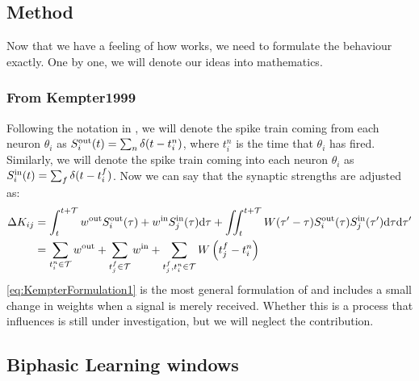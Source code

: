 \subsection{Method}
Now that we have a feeling of how \STDP works, we need to formulate the behaviour exactly. One by one, we will denote our ideas into mathematics.

\subsubsection{From Kempter1999}
Following the notation in \cite{Kempter1999}, we will denote the spike train coming from each neuron $\theta_i$ as $S_i^{\rm out}(t) = \sum_{n} \delta (t-t_{i}^{n})$, where $t_{i}^{n}$ is the time that $\theta_i$ has fired. Similarly, we will denote the spike train coming into each neuron $\theta_i$ as $S_i^{\rm in}(t) = \sum_{f} \delta (t-t_{i}^{f})$. Now we can say that the synaptic strengths are adjusted as:
\begin{align}
\Delta K_{ij} &= \int_{t}^{t+\mathcal{T}} w^{\rm{out}} S_i^{\rm out}(\tau) + w^{\rm{in}} S_{j}^{\rm {in}}(\tau) \mathrm{d}\tau
+ \iint_{t}^{t+\mathcal{T}} W( \tau^\prime - \tau) S_{i}^{\rm out}(\tau) S_{j}^{\rm in}( \tau^\prime) \mathrm{d} \tau \mathrm{d} \tau^\prime
\label{eq:KempterFormulation1} \\
&= \sum_{t_i^{n}\in \mathcal{T}} w^{\mathrm{out}} + \sum_{t_{j}^{f} \in \mathcal{T}} w^{\mathrm{in}} + \sum_{t_{j}^{f}, t_i^{n} \in \mathcal{T}} W\left(t_{j}^{f}-t_i^{n}\right) \label{eq:KempterFormulation2}
\end{align}
\eqref{eq:KempterFormulation1} is the most general formulation of \STDP and includes a small change in weights when a signal is merely received. Whether this is a process that influences \STDP is still under investigation, but we will neglect the contribution.


\subsection{Biphasic Learning windows}
